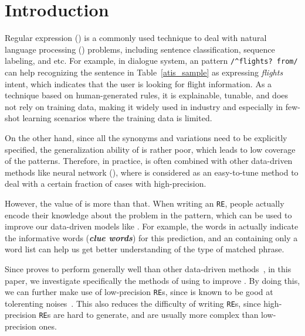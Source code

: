\section{Introduction}



Regular expression (\RE) is a commonly used technique to deal with natural language processing (\NLP) problems, including sentence classification, sequence labeling, and etc.
For example, in dialogue system, an \RE pattern \texttt{/\textasciicircum flights? from/} can help recognizing the sentence in Table~\ref{atis_sample} as expressing \emph{flights} intent, which indicates that the user is looking for flight information.
As a technique based on human-generated rules, it is explainable, tunable, and does not rely on training data, making it widely used in industry and especially in few-shot learning scenarios where the training data is limited.

On the other hand, since all the synonyms and variations need to be explicitly specified, the generalization ability of \RE is rather poor, which leads to low coverage of the patterns. Therefore, in practice, \RE is often combined with other data-driven methods like neural network (\NN), where \RE is considered as an easy-to-tune method to deal with a certain fraction of cases with high-precision. 

However, the value of \RE is more than that. When writing an \texttt{RE}, people actually encode their knowledge about the problem in the pattern, which can be used to improve our data-driven models like \NN. For example, the words in \RE actually indicate the informative words (\textbf{\emph{clue words}}) for this prediction, and an \RE containing only a word list can help us get better understanding of the type of matched phrase.

Since \NN proves to perform generally well than other data-driven methods~\cite{kim2014convolutional, bahdanau2014neural, yih2015semantic}, in this paper, we investigate specifically the methods of using \RE to improve \NN. 
By doing this, we can further make use of low-precision \texttt{RE}s, since \NN is known to be good at tolerenting noises~\cite{srivastava2014dropout, xie2016disturblabel}. 
This also reduces the difficulty of writing \texttt{RE}s, since high-precision \texttt{RE}s are hard to generate, and are usually more complex than low-precision ones.

